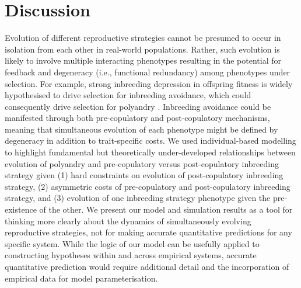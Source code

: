 \documentclass[10pt,letterpaper]{article}
\begin{document}


\section*{Discussion}

Evolution of different reproductive strategies cannot be presumed to occur in isolation from each other in real-world populations. Rather, such evolution is likely to involve multiple interacting phenotypes resulting in the potential for feedback and degeneracy (i.e., functional redundancy) among phenotypes under selection. For example, strong inbreeding depression in offspring fitness is widely hypothesised to drive selection for inbreeding avoidance, which could consequently drive selection for polyandry \cite[e.g., ][]{Zeh1997, Jennions2000, Tregenza2002}. Inbreeding avoidance could be manifested through both pre-copulatory and post-copulatory mechanisms, meaning that simultaneous evolution of each phenotype might be defined by degeneracy in addition to trait-specific costs. We used individual-based modelling to highlight fundamental but theoretically under-developed relationships between evolution of polyandry and pre-copulatory versus post-copulatory inbreeding strategy given (1) hard constraints on evolution of post-copulatory inbreeding strategy, (2) asymmetric costs of pre-copulatory and post-copulatory inbreeding strategy, and (3) evolution of one inbreeding strategy phenotype given the pre-existence of the other. We present our model and simulation results as a tool for thinking more clearly about the dynamics of simultaneously evolving reproductive strategies, not for making accurate quantitative predictions for any specific system. While the logic of our model can be usefully applied to constructing hypotheses within and across empirical systems, accurate quantitative prediction would require additional detail and the incorporation of empirical data for model parameterisation.
\end{document}
